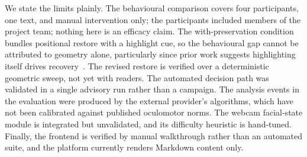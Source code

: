 We state the limits plainly.
The behavioural comparison covers four participants, one text, and manual intervention only; the participants included members of the project team; nothing here is an efficacy claim.
The with-preservation condition bundles positional restore with a highlight cue, so the behavioural gap cannot be attributed to geometry alone, particularly since prior work suggests highlighting itself drives recovery~\cite{jensen2025context}.
The revised restore is verified over a deterministic geometric sweep, not yet with readers.
The automated decision path was validated in a single advisory run rather than a campaign.
The analysis events in the evaluation were produced by the external provider's algorithms, which have not been calibrated against published oculomotor norms.
The webcam facial-state module is integrated but unvalidated, and its difficulty heuristic is hand-tuned.
Finally, the frontend is verified by manual walkthrough rather than an automated suite, and the platform currently renders Markdown content only.
